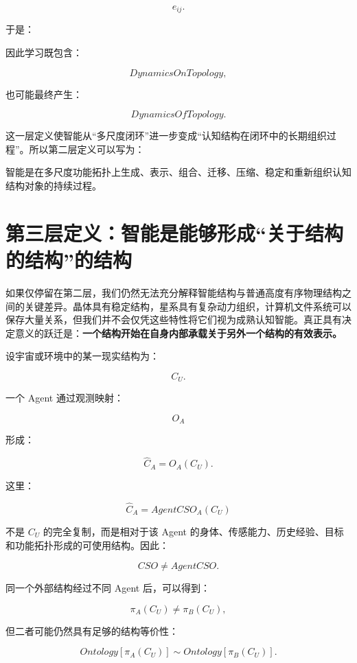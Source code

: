 \[
e_{ij}.
\]

于是：

\begin{statementbox}
\centering
{}
\end{statementbox}

因此学习既包含：

\[
DynamicsOnTopology,
\]

也可能最终产生：

\[
DynamicsOfTopology.
\]

这一层定义使智能从“多尺度闭环”进一步变成“认知结构在闭环中的长期组织过程”。所以第二层定义可以写为：

\begin{definition*}
智能是在多尺度功能拓扑上生成、表示、组合、迁移、压缩、稳定和重新组织认知结构对象的持续过程。
\end{definition*}

\section{第三层定义：智能是能够形成“关于结构的结构”的结构}

如果仅停留在第二层，我们仍然无法充分解释智能结构与普通高度有序物理结构之间的关键差异。晶体具有稳定结构，星系具有复杂动力组织，计算机文件系统可以保存大量关系，但我们并不会仅凭这些特性将它们视为成熟认知智能。真正具有决定意义的跃迁是：\textbf{一个结构开始在自身内部承载关于另外一个结构的有效表示。}

设宇宙或环境中的某一现实结构为：

\[
C_U.
\]

一个 Agent 通过观测映射：

\[
O_A
\]

形成：

\[
\hat C_A
=
O_A(C_U).
\]

这里：

\[
\hat C_A
=
AgentCSO_A(C_U)
\]

不是 \(C_U\) 的完全复制，而是相对于该 Agent 的身体、传感能力、历史经验、目标和功能拓扑形成的可使用结构。因此：

\[
\boxed{
CSO
\neq
AgentCSO.
}
\]

同一个外部结构经过不同 Agent 后，可以得到：

\[
\pi_A(C_U)
\neq
\pi_B(C_U),
\]

但二者可能仍然具有足够的结构等价性：

\[
Ontology[
\pi_A(C_U)
]
\sim
Ontology[
\pi_B(C_U)
].
\]

